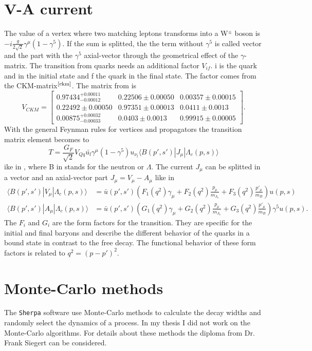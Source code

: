 \section{V-A current} \label{sec:v-a}
The value of a vertex where two matching leptons transforms into a  
W\(^\pm\) boson is \(-i \frac{g}{2\sqrt{2}} \gamma^\mu\left(1-\gamma^5\right)\).
If the sum is splitted, the the term without \(\gamma^5\) is called vector and 
the part with the \(\gamma^5\) axial-vector through the geometrical effect of 
the \(\gamma\)-matrix. The transition from quarks needs an additional factor 
\(V_{if}\). i is the quark and in the initial state and f the quark in the 
final state. The factor comes from the CKM-matrix\(^{\text{\cite{ckm}}}\). The 
matrix from {\cite{ckm}} is
\begin{equation}
  V_{CKM} =
  \begin{bmatrix}
    0.97434^{+0.00011}_{-0.00012} &  0.22506 \pm 0.00050 & 0.00357 \pm 0.00015 \\
    0.22492 \pm 0.00050 & 0.97351 \pm 0.00013 & 0.0411 \pm 0.0013 \\
    0.00875^{+0.00032}_{-0.00033} & 0.0403 \pm 0.0013 & 0.99915 \pm 0.00005
  \end{bmatrix}. \label{eq:ckm}
\end{equation}
With the general Feynman rules for vertices and propagators the transition matrix 
element becomes to
\begin{equation}
  T = \frac{G_F}{\sqrt{2}} V_{Qq} \bar{u_l}\gamma^\mu\left(1 - \gamma^5\right) 
  u_{\nu_l} \langle B(p', s') | J_\mu | \Lambda_c(p, s) \rangle \label{eq:trans}
\end{equation}
ike in {\cite[Eq. 1]{Frank}}, where B in stands for the neutron or \(\Lambda\). The current 
\(J_\mu\) can be splitted in a vector and an axial-vector part \(J_\mu = V_\mu - 
A_\mu \) like in
\begin{align}
  \langle B(p', s') | V_\mu | \Lambda_c(p, s) \rangle & = \bar{u}(p', s') 
  \left( F_1(q^2) \gamma_\mu + F_2(q^2)\frac{p_\mu}{m_{\Lambda_c}} + 
  F_3(q^2)\frac{p'_\mu}{m_B} \right) u(p, s) \nonumber \\
  \langle B(p', s') | A_\mu | \Lambda_c(p, s) \rangle & = \bar{u}(p', s') 
  \left( G_1(q^2) \gamma_\mu + G_2(q^2)\frac{p_\mu}{m_{\Lambda_c}} + 
  G_3(q^2)\frac{p'_\mu}{m_B} \right) \gamma^5 u(p, s). \label{eq:v-a}
\end{align}
The \(F_i\) and \(G_i\) are the form factors for the transition. They are specific 
for the initial and final baryons and describe the different behavior of the 
quarks in a bound state in contrast to the free decay. The functional behavior 
of these form factors is related to \(q^2 = (p - p')^2\).

\section{Monte-Carlo methods}
The \texttt{Sherpa} software use Monte-Carlo methods to calculate the decay
widths and  randomly select the dynamics of a process. In my thesis I did 
not work on the Monte-Carlo algorithms. For details about these methods 
the diploma{\cite{diploma}} from Dr. Frank Siegert can be considered.

